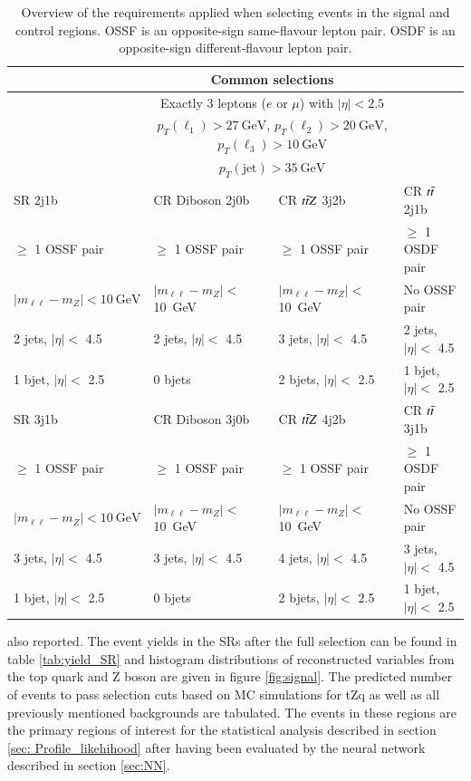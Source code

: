 \begin{table}[hbt!]
\centering
\begin{tabular}{@{} *4l  @{}}
\toprule
& \multicolumn{2}{c}{Common selections} & \\
\midrule
& \multicolumn{2}{c}{Exactly 3 leptons ($e$ or $\mu$) with $|\eta| < 2.5$} &  \\
& \multicolumn{2}{c}{$p_{T}(\ell_1)> \SI{27}{\GeV}$, $p_{T}(\ell_2)> \SI{20}{\GeV}$, $p_{T}(\ell_3)> \SI{10}{\GeV}$} &  \\
& \multicolumn{2}{c}{$p_{T}(\text{jet})> \SI{35}{\GeV}$} &  \\[0.3em]
\toprule
SR 2j1b  & CR Diboson 2j0b & CR $t\Bar{t}Z$ 3j2b & CR $t\Bar{t}$ 2j1b  \\
\midrule
$\ge$ 1 OSSF pair & $\ge$ 1 OSSF pair & $\ge$ 1 OSSF pair & $\ge$ 1 OSDF pair  \\
$|m_{\ell \ell} - m_{Z}| <  \SI{10}{\GeV}$ & $|m_{\ell \ell} - m_{Z}| < $ \SI{10}{\GeV} & $|m_{\ell \ell} - m_{Z}| < $ \SI{10}{\GeV} & No OSSF pair  \\
2 jets, $|\eta| < $ 4.5  & 2 jets, $|\eta| < $ 4.5  & 3 jets, $|\eta| < $ 4.5 & 2 jets, $|\eta| < $ 4.5  \\
1 bjet, $|\eta| < $ 2.5 & 0 bjets & 2 bjets, $|\eta| < $ 2.5  & 1 bjet, $|\eta| < $ 2.5   \\[0.3em]
\toprule
SR 3j1b   & CR Diboson 3j0b & CR $t\Bar{t}Z$ 4j2b & CR $t\Bar{t}$ 3j1b \\
\midrule
$\ge$ 1 OSSF pair & $\ge$ 1 OSSF pair & $\ge$ 1 OSSF pair & $\ge$ 1 OSDF pair \\
$|m_{\ell \ell} - m_{Z}| <  \SI{10}{\GeV}$ & $|m_{\ell \ell} - m_{Z}| < $ \SI{10}{\GeV} & $|m_{\ell \ell} - m_{Z}| < $ \SI{10}{\GeV} & No OSSF pair  \\
3 jets, $|\eta| < $ 4.5  & 3 jets, $|\eta| < $ 4.5  & 4 jets, $|\eta| < $ 4.5 & 3 jets, $|\eta| < $ 4.5  \\
1 bjet, $|\eta| < $ 2.5 & 0 bjets  & 2 bjets, $|\eta| < $ 2.5  & 1 bjet, $|\eta| < $ 2.5   \\
\bottomrule
\end{tabular}
\caption{Overview of the requirements applied when selecting events in the signal and control regions. OSSF is an opposite-sign same-flavour lepton pair. OSDF is an opposite-sign different-flavour lepton pair.}
\label{tab:final_selection}
\end{table}
 
also reported. The event yields in the SRs after the full selection can be found in table \ref{tab:yield_SR} and histogram distributions of reconstructed variables from the top quark and Z boson are given in figure \ref{fig:signal}. The predicted number of events to pass selection cuts based on MC simulations for tZq as well as all previously mentioned backgrounds are tabulated. The events in these regions are the primary regions of interest for the statistical analysis described in section \ref{sec: Profile_likehihood} after having been evaluated by the neural network described in section \ref{sec:NN}.

